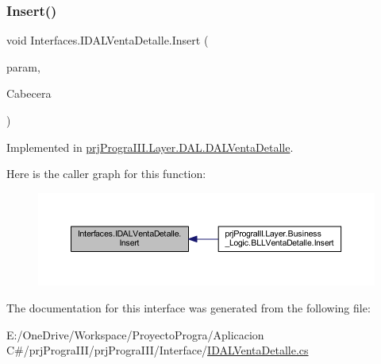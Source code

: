 \subsubsection{\texorpdfstring{Insert()}{Insert()}}
{\footnotesize\ttfamily void Interfaces.\+I\+D\+A\+L\+Venta\+Detalle.\+Insert (\begin{DoxyParamCaption}\item[{\hyperlink{classprj_progra_i_i_i_1_1_layer_1_1_entities_1_1_venta_detalle}{Venta\+Detalle}}]{param,  }\item[{int}]{Cabecera }\end{DoxyParamCaption})}



Implemented in \hyperlink{classprj_progra_i_i_i_1_1_layer_1_1_d_a_l_1_1_d_a_l_venta_detalle_a369ae96a2e9f4a1f15ba28f5a19ab366}{prj\+Progra\+I\+I\+I.\+Layer.\+D\+A\+L.\+D\+A\+L\+Venta\+Detalle}.

Here is the caller graph for this function\+:
\nopagebreak
\begin{figure}[H]
\begin{center}
\leavevmode
\includegraphics[width=350pt]{interface_interfaces_1_1_i_d_a_l_venta_detalle_a9d92a5b36829f84101bdcb0c5ae5eb3a_icgraph}
\end{center}
\end{figure}


The documentation for this interface was generated from the following file\+:\begin{DoxyCompactItemize}
\item 
E\+:/\+One\+Drive/\+Workspace/\+Proyecto\+Progra/\+Aplicacion C\#/prj\+Progra\+I\+I\+I/prj\+Progra\+I\+I\+I/\+Interface/\hyperlink{_i_d_a_l_venta_detalle_8cs}{I\+D\+A\+L\+Venta\+Detalle.\+cs}\end{DoxyCompactItemize}
